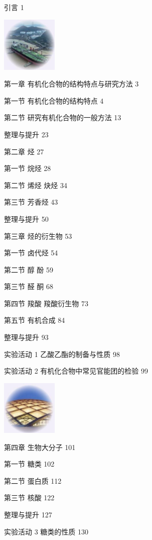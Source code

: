 \documentclass[10pt]{article}
\begin{document}
引言 1

\begin{center}
\includegraphics[max width=0.2\textwidth]{images/0190efc5-b58a-7c43-bfb0-e0a030df9cfd_4_446862.jpg}
\end{center}

第一章 有机化合物的结构特点与研究方法 3

第一节 有机化合物的结构特点 4

第二节 研究有机化合物的一般方法 13

整理与提升 23

第二章 烃 27

第一节 烷烃 28

第二节 烯烃 炔烃 34

第三节 芳香烃 43

整理与提升 50

第三章 烃的衍生物 53

第一节 卤代烃 54

第二节 醇 酚 59

第三节 醛 酮 68

第四节 羧酸 羧酸衍生物 73

第五节 有机合成 84

整理与提升 93

实验活动 1 乙酸乙酯的制备与性质 98

实验活动 2 有机化合物中常见官能团的检验 99

\begin{center}
\includegraphics[max width=0.2\textwidth]{images/0190efc5-b58a-7c43-bfb0-e0a030df9cfd_5_178209.jpg}
\end{center}

第四章 生物大分子 101

第一节 糖类 102

第二节 蛋白质 112

第三节 核酸 122

整理与提升 127

实验活动 3 糖类的性质 130
\end{document}
